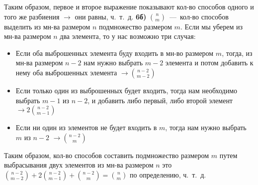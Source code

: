 \documentclass[12pt,a4paper,fleqn]{article}
\begin{document}
Таким образом, первое и второе выражение показывают кол-во способов одного и того же разбиения $\rightarrow$ они равны, ч.~т.~д. \newline \newline
{\bf 6б)} $\displaystyle \binom{n}{m}$~---~кол-во способов выделить из мн-ва размером $n$ подмножество размером $m$. \newline
Если мы уберем из мн-ва размером $n$ два элемента, то у нас возможно три случая:
\begin{itemize}
\item Если оба выброшенных элемента буду входить в мн-во размером $m$, тогда, из мн-ва размером $n -2$ нам нужно выбрать $m - 2$ элемента и потом добавить к нему оба выброшенных элемента $\rightarrow \displaystyle \binom{n - 2}{m - 2}$
\item Если только один из выброшенных будет входить, тогда нам необходимо выбрать $m - 1$ из $n - 2$, и добавить либо первый, либо второй элемент $\rightarrow 2 \displaystyle \binom{n - 2}{m - 1}$
\item Если ни один из элементов не будет входить в $m$, тогда нам нужно выбрать  $m$ из $n - 2$ $\rightarrow \displaystyle \binom{n - 2}{m}$
\end{itemize}
Таким образом, кол-во способов составить подмножество размером $m$ путем выбрасывания двух элементов из мн-ва размером $n$ это $\displaystyle \binom{n -2 }{m - 2} + 2\binom{n - 2}{m - 1} + \binom{n - 2}{m} = \binom{n}{m}$ по определению, ч.~т.~д.
\end{document}
